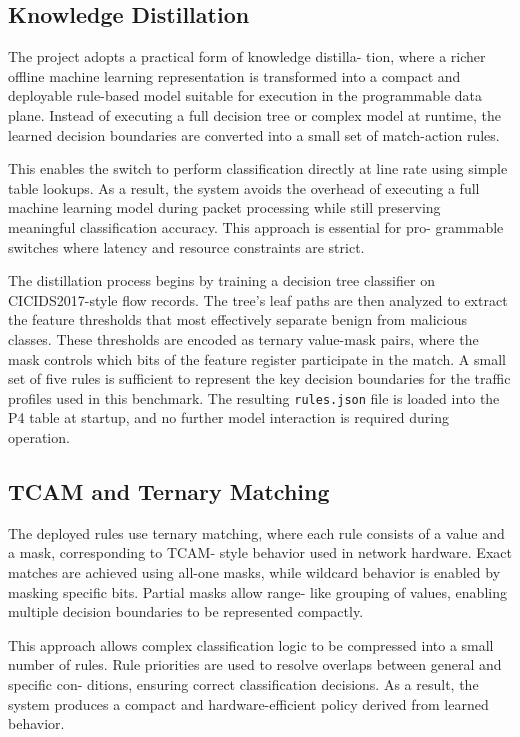 \documentclass[conference]{IEEEtran}
\begin{document}
\subsection{Knowledge Distillation}

The project adopts a practical form of knowledge distilla-
tion, where a richer offline machine learning representation is
transformed into a compact and deployable rule-based model
suitable for execution in the programmable data plane. Instead
of executing a full decision tree or complex model at runtime,
the learned decision boundaries are converted into a small set
of match-action rules.

This enables the switch to perform classification directly at
line rate using simple table lookups. As a result, the system
avoids the overhead of executing a full machine learning model
during packet processing while still preserving meaningful
classification accuracy. This approach is essential for pro-
grammable switches where latency and resource constraints
are strict.

The distillation process begins by training a decision tree
classifier on CICIDS2017-style flow records. The tree's leaf
paths are then analyzed to extract the feature thresholds that
most effectively separate benign from malicious classes. These
thresholds are encoded as ternary value-mask pairs, where the
mask controls which bits of the feature register participate in
the match. A small set of five rules is sufficient to represent
the key decision boundaries for the traffic profiles used in this
benchmark. The resulting \texttt{rules.json} file is loaded into
the P4 table at startup, and no further model interaction is
required during operation.

\subsection{TCAM and Ternary Matching}

The deployed rules use ternary matching, where each rule
consists of a value and a mask, corresponding to TCAM-
style behavior used in network hardware. Exact matches are
achieved using all-one masks, while wildcard behavior is
enabled by masking specific bits. Partial masks allow range-
like grouping of values, enabling multiple decision boundaries
to be represented compactly.

This approach allows complex classification logic to be
compressed into a small number of rules. Rule priorities are
used to resolve overlaps between general and specific con-
ditions, ensuring correct classification decisions. As a result,
the system produces a compact and hardware-efficient policy
derived from learned behavior.
\end{document}
